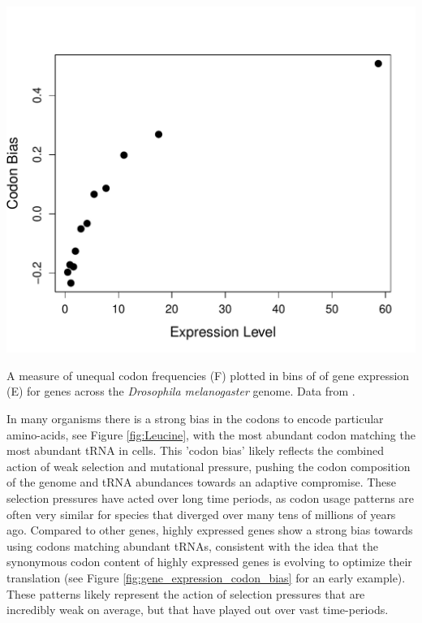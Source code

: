 {\begin{marginfigure}
\begin{center}
\includegraphics[width=\textwidth]{Journal_figs/drift_selection/Codon_bias_Drosophila/Drosophila_codon_bias_expression.pdf}
\end{center}
\caption{A measure of unequal codon frequencies (F) plotted in bins of
    of gene expression (E) for genes across the {\it Drosophila
      melanogaster} genome. Data from
  \citet{hey2002interactions}. } \label{fig:gene_expression_codon_bias}
\end{marginfigure}
In many organisms there is a strong bias in the codons to encode
particular amino-acids, see Figure \ref{fig:Leucine}, with the most
abundant codon matching the most abundant tRNA in cells. This 'codon bias' likely reflects the combined action of weak selection and
mutational pressure, pushing the codon composition of the genome and tRNA abundances towards an adaptive compromise. These selection
pressures have acted over long time periods, as codon usage patterns
are often very similar for species that diverged over many tens of millions of years ago. 
Compared to other genes, highly expressed genes show a strong bias towards using
codons matching abundant tRNAs, consistent with the idea that the synonymous codon content of
highly expressed genes is evolving to optimize their
translation (see Figure \ref{fig:gene_expression_codon_bias} for an early example). These patterns likely represent the action of
selection pressures that are incredibly weak on average, but that have played out
over vast time-periods. 



}
